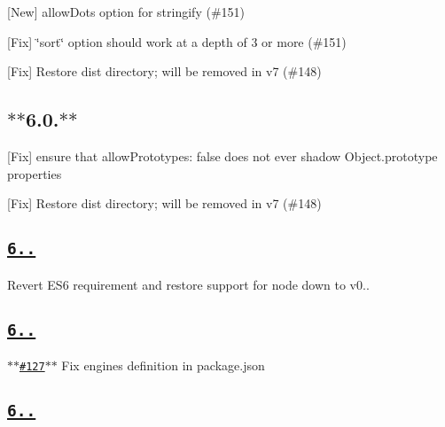 \begin{DoxyItemize}
\item \mbox{[}New\mbox{]} allow\+Dots option for {\ttfamily stringify} (\#151)
\item \mbox{[}Fix\mbox{]} \char`\"{}sort\char`\"{} option should work at a depth of 3 or more (\#151)
\item \mbox{[}Fix\mbox{]} Restore {\ttfamily dist} directory; will be removed in v7 (\#148)
\end{DoxyItemize}

\subsection*{$\ast$$\ast$6.0.$\ast$$\ast$}


\begin{DoxyItemize}
\item \mbox{[}Fix\mbox{]} ensure that {\ttfamily allow\+Prototypes\+: false} does not ever shadow Object.\+prototype properties
\item \mbox{[}Fix\mbox{]} Restore {\ttfamily dist} directory; will be removed in v7 (\#148)
\end{DoxyItemize}

\subsection*{\href{https://github.com/ljharb/qs/issues?milestone=33&state=closed}{\tt {\bfseries 6..}}}


\begin{DoxyItemize}
\item Revert E\+S6 requirement and restore support for node down to v0..
\end{DoxyItemize}

\subsection*{\href{https://github.com/ljharb/qs/issues?milestone=32&state=closed}{\tt {\bfseries 6..}}}


\begin{DoxyItemize}
\item \href{https://github.com/ljharb/qs/pull/127}{\tt $\ast$$\ast$\#127$\ast$$\ast$} Fix engines definition in package.\+json
\end{DoxyItemize}

\subsection*{\href{https://github.com/ljharb/qs/issues?milestone=31&state=closed}{\tt {\bfseries 6..}}}



